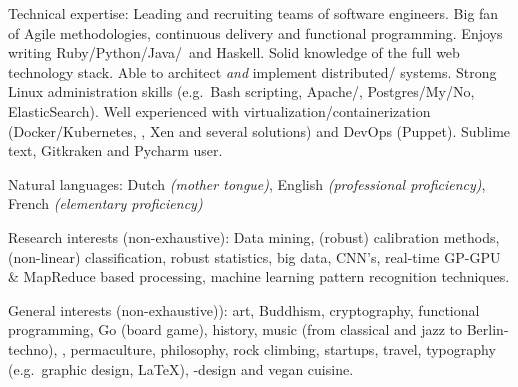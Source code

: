 \documentclass[10pt,a4paper]{article}
\begin{document}
\spacedhrule{1.6em}{-0.4em}


\inlineheadsection  %
{Technical expertise:}
{Leading and recruiting teams of software engineers.  Big fan of Agile methodologies, continuous delivery and functional programming.  Enjoys writing Ruby/\nsp Python/\nsp Java/\nsp \CPP~and Haskell.  Solid knowledge of the full web technology stack.  Able to architect \textit{and} implement distributed/ systems.  Strong Linux administration skills (e.g.\ Bash scripting, Apache/, Postgres/My/No, ElasticSearch).  Well experienced with virtualization/containerization (Docker/Kubernetes, , Xen and several  solutions) and DevOps (Puppet).  Sublime text, Gitkraken and Pycharm user.}

\vspace{0.5em}
\inlineheadsection
{Natural languages:}
{Dutch \emph{(mother tongue)}, English \emph{(professional proficiency)}, French \emph{(elementary proficiency)}}

\spacedhrule{1.6em}{-0.4em}


\inlineheadsection	
{Research interests (non-exhaustive):}
{Data mining, (robust) calibration methods, (non-linear) classification, robust statistics, big data, CNN's, real-time GP-GPU \& MapReduce based processing, machine learning pattern recognition techniques.}

\inlineheadsection	
  {General interests (non-exhaustive)):}
  {art, Buddhism, cryptography, functional programming, Go (board game), history, music (from classical and jazz to Berlin-techno), , permaculture, philosophy, rock climbing, startups, travel, typography (e.g.\ graphic design, \LaTeX), -design and vegan cuisine.}
\end{document}
